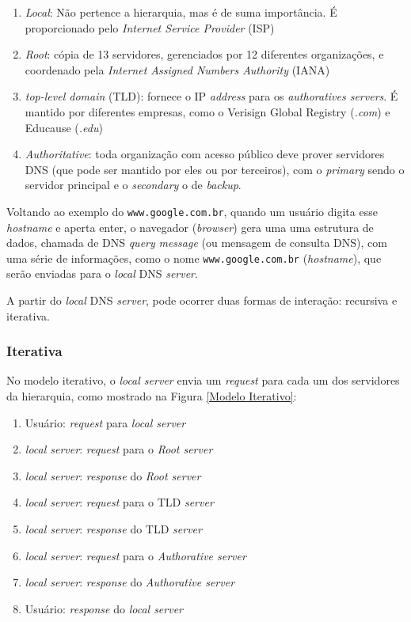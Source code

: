 \begin{enumerate}
\def\labelenumi{\arabic{enumi}.}
\setcounter{enumi}{-1}
\tightlist
\item
  \emph{Local}: Não pertence a hierarquia, mas é de suma importância. É
  proporcionado pelo \emph{Internet Service Provider} (ISP)
\item
  \emph{Root}: cópia de 13 servidores, gerenciados por 12 diferentes
  organizações, e coordenado pela \emph{Internet Assigned Numbers
  Authority} (IANA)
\item
  \emph{top-level domain} (TLD): fornece o IP \emph{address} para os
  \emph{authoratives servers}. É mantido por diferentes empresas, como o
  Verisign Global Registry (\emph{.com}) e Educause (\emph{.edu})
\item
  \emph{Authoritative}: toda organização com acesso público deve prover
  servidores DNS (que pode ser mantido por eles ou por terceiros), com o
  \emph{primary} sendo o servidor principal e o \emph{secondary} o de
  \emph{backup}.
\end{enumerate}

Voltando ao exemplo do \texttt{www.google.com.br}, quando um usuário
digita esse \emph{hostname} e aperta enter, o navegador (\emph{browser})
gera uma uma estrutura de dados, chamada de DNS \emph{query}
\emph{message} (ou mensagem de consulta DNS), com uma série de
informações, como o nome \texttt{www.google.com.br} (\emph{hostname}),
que serão enviadas para o \emph{local} DNS \emph{server}.

A partir do \emph{local} DNS \emph{server}, pode ocorrer duas formas de
interação: recursiva e iterativa.

\hypertarget{iterativa}{%
\subsubsection{Iterativa}\label{iterativa}}

No modelo iterativo, o \emph{local server} envia um \emph{request} para
cada um dos servidores da hierarquia, como mostrado na Figura \ref{Modelo Iterativo}:

\begin{enumerate}
\def\labelenumi{\arabic{enumi}.}
\tightlist
\item
  Usuário: \emph{request} para \emph{local server}
\item
  \emph{local server}: \emph{request} para o \emph{Root server}
\item
  \emph{local server}: \emph{response} do \emph{Root server}
\item
  \emph{local server}: \emph{request} para o TLD \emph{server}
\item
  \emph{local server}: \emph{response} do TLD \emph{server}
\item
  \emph{local server}: \emph{request} para o \emph{Authorative server}
\item
  \emph{local server}: \emph{response} do \emph{Authorative server}
\item
  Usuário: \emph{response} do \emph{local server}
\end{enumerate}


